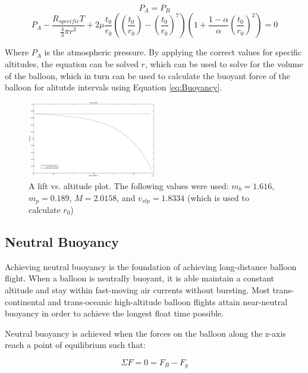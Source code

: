 \documentclass[usenatbib]{mn2e}
\newcommand{\f}[2]{\frac{#1}{#2}}
\begin{document}
\begin{equation}
P_A = P_B
\end{equation}
\begin{equation}
P_A - \f{R_{specific}T}{\f{4}{3} \pi r^3} + 2\mu\frac{t_0}{r_0}((\frac{t_0}{r_0})-(\frac{t_0}{r_0})^7)(1+\frac{1-\alpha}{\alpha}(\frac{t_0}{r_0})^2) = 0
\end{equation}

Where $P_A$ is the atmospheric pressure. By applying the correct values for specific altitudes, the equation can be solved $r$, which can be used to solve for the volume of the balloon, which in turn can be used to calculate the buoyant force of the balloon for alitutde intervals using Equation \ref{eq:Buoyancy}.

\begin{figure}
\begin{center}
  \includegraphics[width=0.5\textwidth]{lift.eps}
  \caption{A lift vs. altitude plot. The following values were used: $m_b = 1.616$, $m_p = 0.189$, $M = 2.0158$, and $v_{stp} = 1.8334$ (which is used to calculate $r_0$)}
\end{center}
\end{figure}

\subsection{Neutral Buoyancy}

Achieving neutral buoyancy is the foundation of achieving long-distance balloon flight. When a balloon is neutrally buoyant, it is able maintain a constant altitude and stay within fast-moving air currents without bursting. Most trans-continental and trans-oceanic high-altitude balloon flights attain near-neutral buoyancy in order to achieve the longest float time possible.

Neutral buoyancy is achieved when the forces on the balloon along the z-axis reach a point of equilibrium such that:

\begin{equation}
\Sigma F = 0 = F_B - F_g
\end{equation}
\end{document}
